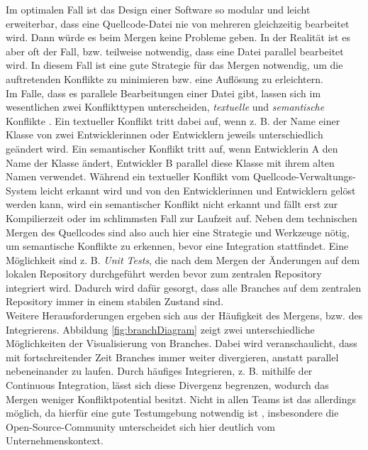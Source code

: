 Im optimalen Fall ist das Design einer Software so modular und leicht erweiterbar, dass eine Quellcode-Datei nie von mehreren gleichzeitig bearbeitet wird. Dann würde es beim Mergen keine Probleme geben. In der Realität ist es aber oft der Fall, bzw. teilweise notwendig, dass eine Datei parallel bearbeitet wird. In diesem Fall ist eine gute Strategie für das Mergen notwendig, um die auftretenden Konflikte zu minimieren bzw. eine Auflösung zu erleichtern. 
\\
Im Falle, dass es parallele Bearbeitungen einer Datei gibt, lassen sich im wesentlichen zwei Konflikttypen unterscheiden, \emph{textuelle} und \emph{semantische} Konflikte \cite{Fowler:2020:Patterns:07}. Ein textueller Konflikt tritt dabei auf, wenn z. B. der Name einer Klasse von zwei Entwicklerinnen oder Entwicklern jeweils unterschiedlich geändert wird. Ein semantischer Konflikt tritt auf, wenn Entwicklerin A den Name der Klasse ändert, Entwickler B parallel diese Klasse mit ihrem alten Namen verwendet. Während ein textueller Konflikt vom Quellcode-Verwaltungs-System leicht erkannt wird und von den Entwicklerinnen und Entwicklern gelöst werden kann, wird ein semantischer Konflikt nicht erkannt und fällt erst zur Kompilierzeit oder im schlimmsten Fall zur Laufzeit auf. Neben dem technischen Mergen des Quellcodes sind also auch hier eine Strategie und Werkzeuge nötig, um semantische Konflikte zu erkennen, bevor eine Integration stattfindet. 
Eine Möglichkeit sind z. B. \emph{Unit Tests}, die nach dem Mergen der Änderungen auf dem lokalen Repository durchgeführt werden bevor zum zentralen Repository integriert wird. Dadurch wird dafür gesorgt, dass alle Branches auf dem zentralen Repository immer in einem stabilen Zustand sind.
\\
Weitere Herausforderungen ergeben sich aus der Häufigkeit des Mergens, bzw. des Integrierens. Abbildung \ref{fig:branchDiagram} zeigt zwei unterschiedliche Möglichkeiten der Visualisierung von Branches. Dabei wird veranschaulicht, dass mit fortschreitender Zeit Branches immer weiter divergieren, anstatt parallel nebeneinander zu laufen. 
Durch häufiges Integrieren, z. B. mithilfe der Continuous Integration, lässt sich diese Divergenz begrenzen, wodurch das Mergen weniger Konfliktpotential besitzt. Nicht in allen Teams ist das allerdings möglich, da hierfür eine gute Testumgebung notwendig ist \cite{Fowler:2020:Patterns:07}, insbesondere die Open-Source-Community unterscheidet sich hier deutlich vom Unternehmenskontext. 


